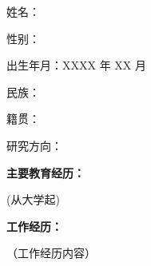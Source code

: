 
\begin{achievement}

姓名：

性别：

出生年月：XXXX 年 XX 月

民族：

籍贯：

研究方向：

{\bf 主要教育经历：}

(从大学起)

{\bf 工作经历：}

（工作经历内容）

\end{achievement}



